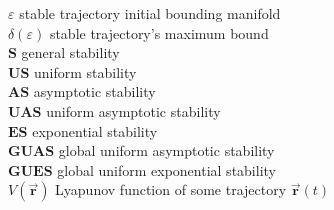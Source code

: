 \documentclass[a4paper, 11pt, oneside, openright, parskip=full]{book}
\begin{document}
$\varepsilon$ stable trajectory initial bounding manifold\\
$\delta (\varepsilon)$ stable trajectory's maximum bound\\
$\mathbf{S}$ general stability\\
$\mathbf{US}$ uniform stability\\
$\mathbf{AS}$ asymptotic stability\\
$\mathbf{UAS}$ uniform asymptotic stability\\
$\mathbf{ES}$ exponential stability\\
$\mathbf{GUAS}$ global uniform asymptotic stability\\
$\mathbf{GUES}$ global uniform exponential stability\\
$V(\vec{\mathbf{r}})$ Lyapunov function of some trajectory $\vec{\mathbf{r}}(t)$\\
\tableofcontents

\listoffigures

\listoftables



\mainmatter








\end{document}

